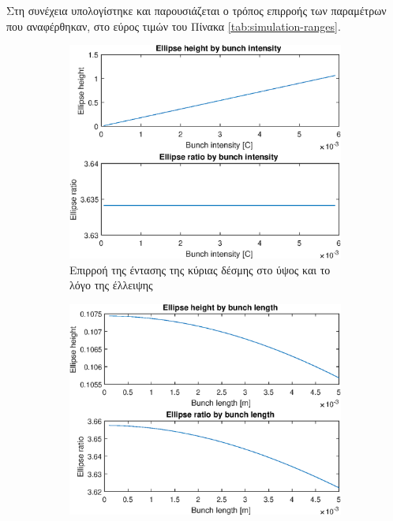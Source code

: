 Στη συνέχεια υπολογίστηκε και παρουσιάζεται ο τρόπος επιρροής των παραμέτρων που αναφέρθηκαν, στο εύρος τιμών του Πίνακα \ref{tab:simulation-ranges}.


\begin{figure}[tph]	
	\centering
	\begin{subfigure}{0.47\textwidth}
		\includegraphics[width=\linewidth]{figures/MATLAB-variable-analysis/EBS-variables-intensity}
		\centering
		\caption{Επιρροή της έντασης της κύριας δέσμης στο ύψος και το λόγο της έλλειψης}
		\label{fig:EBS-variables-intensity}
	\end{subfigure}
	\hfill
	\begin{subfigure}{0.47\textwidth}
		\includegraphics[width=\linewidth]{figures/MATLAB-variable-analysis/EBS-variables-length}

\end{subfigure}
\end{figure}
